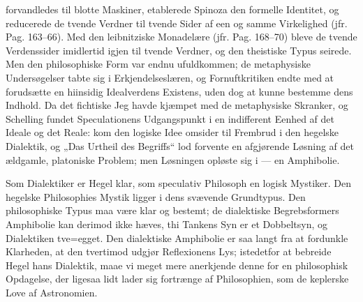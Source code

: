 \documentclass[12pt]{book}
\begin{document}
forvandledes til blotte Maskiner, etablerede Spinoza den formelle Identitet, og reducerede
de tvende Verdner til tvende Sider af een og samme Virkelighed (jfr. Pag. 163--66). Med
den leibnitziske Monadelære (jfr. Pag. 168--70) bleve de tvende Verdenssider imidlertid
igjen til tvende Verdner, og den theistiske Typus seirede. Men den philosophiske Form var
endnu ufuldkommen; de metaphysiske Undersøgelser tabte sig i Erkjendelseslæren, og
Fornuftkritiken endte med at forudsætte en hiinsidig Idealverdens Existens, uden dog at
kunne bestemme dens Indhold. Da det fichtiske Jeg havde kjæmpet med de metaphysiske
Skranker, og Schelling fundet Speculationens Udgangspunkt i en indifferent Eenhed af det
Ideale og det Reale: kom den logiske Idee omsider til Frembrud i den hegelske Dialektik, og
„Das Urtheil des Begriffs“ lod forvente en afgjørende Løsning af det ældgamle, platoniske
Problem; men Løsningen opløste sig i --- en Amphibolie.

Som Dialektiker er Hegel klar, som speculativ Philosoph en logisk Mystiker. Den hegelske
Philosophies Mystik ligger i dens svævende Grundtypus. Den philosophiske Typus maa være
klar og bestemt; de dialektiske Begrebsformers Amphibolie kan derimod ikke hæves, thi
Tankens Syn er et Dobbeltsyn, og Dialektiken tve=egget. Den dialektiske Amphibolie er saa
langt fra at fordunkle Klarheden, at den tvertimod udgjør Reflexionens Lys; istedetfor at
bebreide Hegel hans Dialektik, maae vi meget mere anerkjende denne for en philosophisk
Opdagelse, der ligesaa lidt lader sig fortrænge af Philosophien, som de keplerske Love af
Astronomien.
\end{document}
